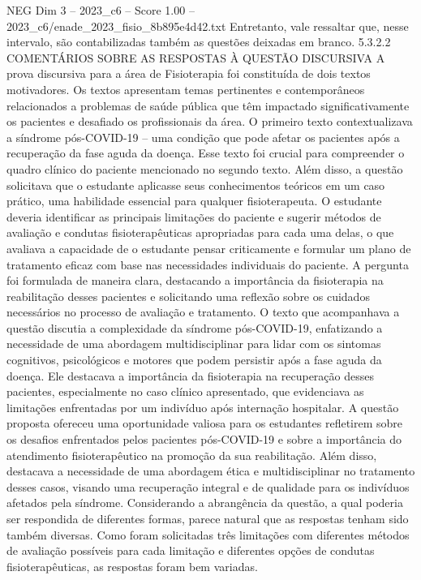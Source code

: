 \begin{textsample}{NEG Dim 3 – 2023\_c6 – Score 1.00 – 2023\_c6/enade\_2023\_fisio\_8b895e4d42.txt}
Entretanto, vale ressaltar que, nesse intervalo, são contabilizadas também as questões deixadas em branco. 5.3.2.2 COMENTÁRIOS SOBRE AS RESPOSTAS À QUESTÃO DISCURSIVA A prova discursiva para a área de Fisioterapia foi constituída de dois textos motivadores.
Os textos apresentam temas pertinentes e contemporâneos relacionados a problemas de saúde pública que têm impactado significativamente os pacientes e desafiado os profissionais da área.
O primeiro texto contextualizava a síndrome pós-COVID-19 – uma condição que pode afetar os pacientes após a recuperação da fase aguda da doença.
Esse texto foi crucial para compreender o quadro clínico do paciente mencionado no segundo texto.
Além disso, a questão solicitava que o estudante aplicasse seus conhecimentos teóricos em um caso prático, uma habilidade essencial para qualquer fisioterapeuta.
O estudante deveria identificar as principais limitações do paciente e sugerir métodos de avaliação e condutas fisioterapêuticas apropriadas para cada uma delas, o que avaliava a capacidade de o estudante pensar criticamente e formular um plano de tratamento eficaz com base nas necessidades individuais do paciente.
A pergunta foi formulada de maneira clara, destacando a importância da fisioterapia na reabilitação desses pacientes e solicitando uma reflexão sobre os cuidados necessários no processo de avaliação e tratamento.
O texto que acompanhava a questão discutia a complexidade da síndrome pós-COVID-19, enfatizando a necessidade de uma abordagem multidisciplinar para lidar com os sintomas cognitivos, psicológicos e motores que podem persistir após a fase aguda da doença.
Ele destacava a importância da fisioterapia na recuperação desses pacientes, especialmente no caso clínico apresentado, que evidenciava as limitações enfrentadas por um indivíduo após internação hospitalar.
A questão proposta ofereceu uma oportunidade valiosa para os estudantes refletirem sobre os desafios enfrentados pelos pacientes pós-COVID-19 e sobre a importância do atendimento fisioterapêutico na promoção da sua reabilitação.
Além disso, destacava a necessidade de uma abordagem ética e multidisciplinar no tratamento desses casos, visando uma recuperação integral e de qualidade para os indivíduos afetados pela síndrome.
Considerando a abrangência da questão, a qual poderia ser respondida de diferentes formas, parece natural que as respostas tenham sido também diversas.
Como foram solicitadas três limitações com diferentes métodos de avaliação possíveis para cada limitação e diferentes opções de condutas fisioterapêuticas, as respostas foram bem variadas.

\end{textsample}
